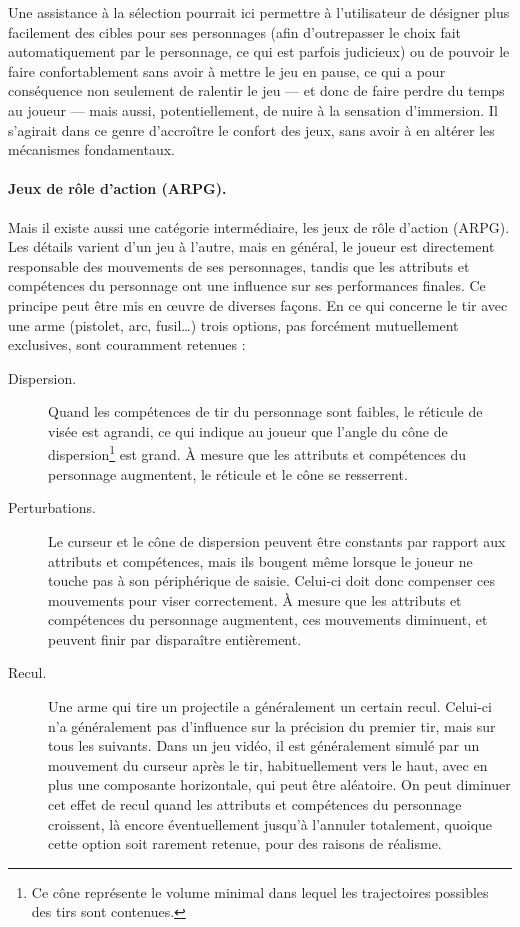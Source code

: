 	Une assistance à la sélection pourrait ici permettre à l'utilisateur de désigner plus facilement des cibles pour ses personnages (afin d'outrepasser le choix fait automatiquement par le personnage, ce qui est parfois judicieux) ou de pouvoir le faire confortablement sans avoir à mettre le jeu en pause, ce qui a pour conséquence non seulement de ralentir le jeu --- et donc de faire perdre du temps au joueur --- mais aussi, potentiellement, de nuire à la sensation d'immersion. Il s'agirait dans ce genre d'accroître le confort des jeux, sans avoir à en altérer les mécanismes fondamentaux.
	
	\paragraph{Jeux de rôle d'action (ARPG).}
	Mais il existe aussi une catégorie intermédiaire, les jeux de rôle d'action (ARPG). Les détails varient d'un jeu à l'autre, mais en général, le joueur est directement responsable des mouvements de ses personnages, tandis que les attributs et compétences du personnage ont une influence sur ses performances finales. Ce principe peut être mis en œuvre de diverses façons. En ce qui concerne le tir avec une arme (pistolet, arc, fusil\ldots{}) trois options, pas forcément mutuellement exclusives, sont couramment retenues :
	\begin{description}
		\item[Dispersion.] Quand les compétences de tir du personnage sont faibles, le réticule de visée est agrandi, ce qui indique au joueur que l'angle du cône de dispersion\footnote{Ce cône représente le volume minimal dans lequel les trajectoires possibles des tirs sont contenues.} est grand. À mesure que les attributs et compétences du personnage augmentent, le réticule et le cône se resserrent.
		\item[Perturbations.] Le curseur et le cône de dispersion peuvent être constants par rapport aux attributs et compétences, mais ils bougent même lorsque le joueur ne touche pas à son périphérique de saisie. Celui-ci doit donc compenser ces mouvements pour viser correctement. À mesure que les attributs et compétences du personnage augmentent, ces mouvements diminuent, et peuvent finir par disparaître entièrement.
		\item[Recul.] Une arme qui tire un projectile a généralement un certain recul. Celui-ci n'a généralement pas d'influence sur la précision du premier tir, mais sur tous les suivants. Dans un jeu vidéo, il est généralement simulé par un mouvement du curseur après le tir, habituellement vers le haut, avec en plus une composante horizontale, qui peut être aléatoire. On peut diminuer cet effet de recul quand les attributs et compétences du personnage croissent, là encore éventuellement jusqu'à l'annuler totalement, quoique cette option soit rarement retenue, pour des raisons de réalisme.
	\end{description}

